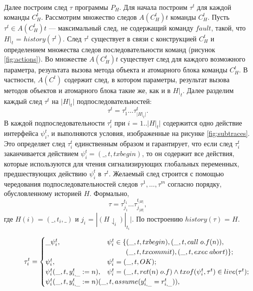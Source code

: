 \begin{myproof}
Далее построим след $\tau$ программы $P_H$. Для начала построим $\tau^t$ для каждой команды $C^t_H$. Рассмотрим множество следов $A(C^t_H)t$ команды $C^t_H$. Пусть $\tau^t \in A(C^t_H)t$ --- максимальный след, не содержащий команду $fault$, такой, что $H|_t$ = $history(\tau^t)$. След $\tau^t$ существует в связи с конструкцией $C^t_H$ и определением множества следов последовательности команд (рисунок \ref{fig:actions}). Во множестве $A(C^t_H)t$ существует след для каждого возможного параметра, результата вызова метода объекта и атомарного блока команды $C^t_H$. В частности, $A(C^t)$ содержит след, в котором параметры, результат вызова методов объектов и атомарного блока такие же, как и в $H|_t$. Далее разделим каждый след $\tau^t$ на $|H|_t|$ подпоследовательностей: 
\begin{equation}\label{eq:tau_t}
\tau^t = \tau^t_1\ldots\tau^t_{|H|_t|}.
\end{equation}
В каждой подпоследовательности $\tau^t_i$ при $i$ = $1..|H|_t|$  содержится одно действие интерфейса $\psi^t_i$, и выполняются условия, изображенные на рисунке \ref{fig:subtraces}. Это определяет след $\tau^t_i$ единственным образом и гарантирует, что если след $\tau^t_i$ заканчивается действием $\psi^t_i = (\_,t,txbegin)$, то он содержит все действия, которые используются для чтения сигнализирующих глобальных переменных, предшествующих действию $\psi^t_i$ в $\tau^t$. Желаемый след строится с помощью чередования подпоследовательностей следов $\tau^1,\ldots,\tau^m$ согласно порядку, обусловленному историей $H$. Формально, 
\begin{equation}\label{eq:tau}
\tau = \tau^{t_1}_{j_1} \ldots \tau^{t_{|H|}}_{j_{|H|}},
\end{equation}
где $H(i)$ = $(\_, t_i, \_)$ и $j_i$ = $|(H \downharpoonleft_i)|_{t_i}|.$ По построению $history(\tau)$ = $H$.
\begin{figure}
\small
\begin{align*}
  \tau^t_i=\begin{cases}
    \_\psi^t_i, & \psi^t_i \in \{(\_,t,txbegin), (\_,t,call \; o.f(n)), \\ & \qquad \; \; \, (\_,t, txcommit), (\_, t, exec \; abort)\};\\
    \psi^t_i, & \psi^t_i = (\_,t, OK); \\
    \psi^t_i(\_,t,y^t_{i,\_} := n), & \psi^t_i = (\_,t, ret(n) \; o.f) \land txof(\psi^t_i, \tau^t) \in live(\tau^t); \\
    \mathrlap{\psi^t_i(\_,t,y^t_{i,\_} := n)(\_,t,assume(y^t_{i,\_} = r^t_{i,\_})),}\\

\end{cases}
\end{align*}
\end{figure}
\end{myproof}
